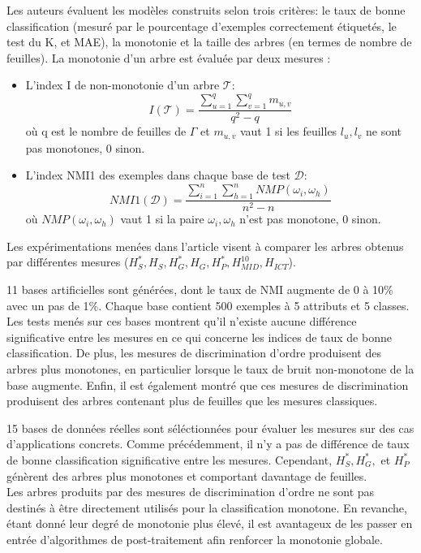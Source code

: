 \documentclass[a4paper]{article}
\begin{document}
Les auteurs évaluent les modèles construits selon trois critères: le taux de bonne
classification (mesuré par le pourcentage d'exemples correctement étiquetés, le
test du K, et MAE), la monotonie et la taille des arbres (en termes de nombre de
feuilles). 
\noindent La monotonie d'un arbre est évaluée par deux mesures :
\begin{itemize}
    \item L'index I de non-monotonie d'un arbre $\mathcal{T}$:  
        $$ I(\mathcal{T}) = \frac{\sum_{u=1}^q \sum_{v=1}^{q} m_{u,v}}{q^2 - q}$$
        où q est le nombre de feuilles de $\Gamma$ et $m_{u,v}$ vaut 1 si les
        feuilles $l_u, l_v$ ne sont pas monotones, 0 sinon.
    \item L'index NMI1 des exemples dans chaque base de test $\mathcal{D}$:
        $$ NMI1(\mathcal{D}) = \frac{\sum_{i=1}^n \sum_{h=1}^{n} NMP(\omega_i,
        \omega_h)}{n^2 - n}$$
        où $NMP(\omega_i, \omega_h)$ vaut 1 si la paire $\omega_i, \omega_h$
        n'est pas monotone, 0 sinon. \\
\end{itemize}

Les expérimentations menées dans l'article visent à comparer les arbres obtenus
par différentes mesures ($H^*_S, H_S, H^*_G, H_G, H^*_P, H^{10}_{MID}, H_{ICT}$).

11 bases artificielles sont générées, dont le taux de NMI augmente de 0 à 10\%
avec un pas de 1\%. Chaque base contient 500 exemples à 5 attributs et 5
classes. \\
\noindent Les tests menés sur ces bases montrent qu'il n'existe aucune
différence significative entre les mesures en ce qui concerne les indices de
taux de bonne classification. De plus, les mesures de discrimination d'ordre
produisent des arbres plus monotones, en particulier lorsque le taux de bruit
non-monotone de la base augmente. Enfin, il est également montré que ces mesures
de discrimination produisent des arbres contenant plus de feuilles que les
mesures classiques.

15 bases de données réelles sont séléctionnées pour évaluer les mesures sur des
cas d'applications concrets. Comme précédemment, il n'y a pas de différence
de taux de bonne classification significative entre les mesures. Cependant,
$H^*_S, H^*_G,$ et $H^*_P$ génèrent des arbres plus monotones et comportant
davantage de feuilles. \\

Les arbres produits par des mesures de discrimination d'ordre ne sont pas
destinés à être directement utilisés pour la classification monotone. En
revanche, étant donné leur degré de monotonie plus élevé, il est avantageux de
les passer en entrée d'algorithmes de post-traitement afin renforcer la
monotonie globale.
\end{document}
